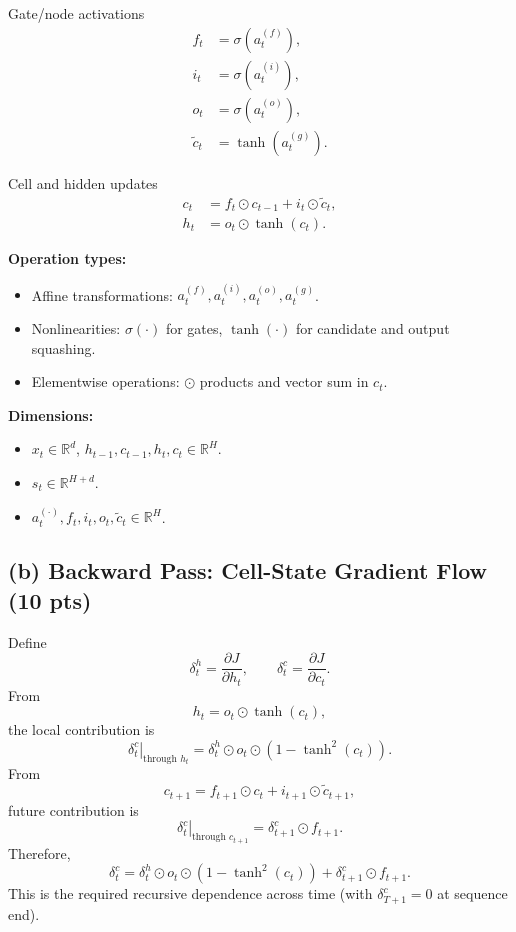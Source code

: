 \documentclass[11pt]{article}
\begin{document}
Gate/node activations
\[
\begin{aligned}
f_t &= \sigma\!\left(a_t^{(f)}\right), \\
i_t &= \sigma\!\left(a_t^{(i)}\right), \\
o_t &= \sigma\!\left(a_t^{(o)}\right), \\
\tilde c_t &= \tanh\!\left(a_t^{(g)}\right).
\end{aligned}
\]

Cell and hidden updates
\[
\begin{aligned}
c_t &= f_t \odot c_{t-1} + i_t \odot \tilde c_t, \\
h_t &= o_t \odot \tanh(c_t).
\end{aligned}
\]

\textbf{Operation types:}
\begin{itemize}[nosep]
    \item Affine transformations: $a_t^{(f)}, a_t^{(i)}, a_t^{(o)}, a_t^{(g)}$.
    \item Nonlinearities: $\sigma(\cdot)$ for gates, $\tanh(\cdot)$ for candidate and output squashing.
    \item Elementwise operations: $\odot$ products and vector sum in $c_t$.
\end{itemize}

\textbf{Dimensions:}
\begin{itemize}[nosep]
    \item $x_t\in\mathbb{R}^d$, $h_{t-1},c_{t-1},h_t,c_t\in\mathbb{R}^H$.
    \item $s_t\in\mathbb{R}^{H+d}$.
    \item $a_t^{(\cdot)}, f_t,i_t,o_t,\tilde c_t\in\mathbb{R}^H$.
\end{itemize}

\subsection*{(b) Backward Pass: Cell-State Gradient Flow (10 pts)}

Define
\[
\delta_t^h = \frac{\partial J}{\partial h_t},
\qquad
\delta_t^c = \frac{\partial J}{\partial c_t}.
\]
From
\[
h_t = o_t\odot\tanh(c_t),
\]
the local contribution is
\[
\left.\delta_t^c\right|_{\text{through }h_t}
= \delta_t^h \odot o_t \odot \left(1-\tanh^2(c_t)\right).
\]
From
\[
c_{t+1} = f_{t+1}\odot c_t + i_{t+1}\odot\tilde c_{t+1},
\]
future contribution is
\[
\left.\delta_t^c\right|_{\text{through }c_{t+1}} = \delta_{t+1}^c \odot f_{t+1}.
\]
Therefore,
\[
\boxed{
\delta_t^c
= \delta_t^h \odot o_t \odot \left(1-\tanh^2(c_t)\right)
+ \delta_{t+1}^c \odot f_{t+1}.
}
\]
This is the required recursive dependence across time (with $\delta_{T+1}^c=0$ at sequence end).
\end{document}
